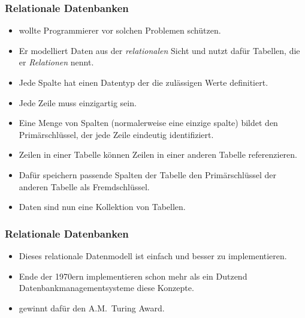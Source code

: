 \documentclass[aspectratio=169,mathserif,notheorems]{beamer}%
\begin{document}
\begin{frame}%
\frametitle{Relationale Datenbanken}%
\begin{itemize}%
\item {} wollte Programmierer vor solchen Problemen schützen.%
\item<2-> Er modelliert Daten aus der \emph{relationalen} Sicht und nutzt dafür Tabellen, die er \emph{Relationen} nennt.%
\item<3-> Jede Spalte hat einen Datentyp der die zulässigen Werte definitiert.%
\item<4-> Jede Zeile muss einzigartig sein.%
\item<5-> Eine Menge von Spalten (normalerweise eine einzige spalte) bildet den Primärschlüssel, der jede Zeile eindeutig identifiziert.%
\item<6-> Zeilen in einer Tabelle können Zeilen in einer anderen Tabelle referenzieren.%
\item<7-> Dafür speichern passende Spalten der Tabelle den Primärschlüssel der anderen Tabelle als Fremdschlüssel.%
\item<8-> Daten sind nun eine Kollektion von Tabellen.%
\end{itemize}%
\end{frame}%
%
\begin{frame}%
\frametitle{Relationale Datenbanken}%
\begin{itemize}%
\item Dieses relationale Datenmodell ist einfach und besser zu implementieren.%
\item<2-> Ende der 1970ern implementieren schon mehr als ein Dutzend Datenbankmanagementsysteme diese Konzepte\cite{K1979RDS}.%
\item<3->  gewinnt dafür den A.M.~Turing Award.%
\end{itemize}%
\end{frame}%
%
\end{document}
